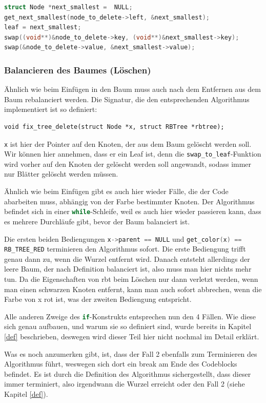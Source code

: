 \documentclass[11pt]{article}
\newcommand{\lstin}[1]{\lstinline[language=C]{#1}}
\begin{document}
\begin{lstlisting}[language=C]
struct Node *next_smallest =  NULL;
get_next_smallest(node_to_delete->left, &next_smallest);
leaf = next_smallest;
swap((void**)&node_to_delete->key, (void**)&next_smallest->key);
swap(&node_to_delete->value, &next_smallest->value);
\end{lstlisting}

\subsubsection{Balancieren des Baumes (Löschen)}
Ähnlich wie beim Einfügen in den Baum muss auch nach dem Entfernen aus dem Baum rebalanciert werden.
Die Signatur, die den entsprechenden Algorithmus implementiert ist so definiert:
\begin{lstlisting}
void fix_tree_delete(struct Node *x, struct RBTree *rbtree);
\end{lstlisting}

\lstin{x} ist hier der Pointer auf den Knoten, der aus dem Baum gelöscht werden soll. Wir können hier annehmen, dass er ein Leaf ist,
denn die \lstin{swap_to_leaf}-Funktion wird vorher auf den Knoten der gelöscht werden soll angewandt, sodass immer nur Blätter gelöscht werden müssen.

Ähnlich wie beim Einfügen gibt es auch hier wieder Fälle, die der Code abarbeiten muss, abhängig von der Farbe bestimmter Knoten.
Der Algorithmus befindet sich in einer \lstin{while}-Schleife, weil es auch hier wieder passieren kann, dass es mehrere Durchläufe gibt, bevor der Baum balanciert ist.

Die ersten beiden Bediengungen \lstin{x->parent == NULL} und \lstin{get_color(x) == RB_TREE_RED} terminieren den Algorithmus sofort.
Die erste Bediengung trifft genau dann zu, wenn die Wurzel entfernt wird. Danach entsteht allerdings der leere Baum, der nach Definition balanciert ist, also muss man hier nichts mehr tun.
Da die Eigenschaften von \gls{rbt} beim Löschen nur dann verletzt werden, wenn man einen schwarzen Knoten entfernt,
kann man auch sofort abbrechen, wenn die Farbe von x rot ist, was der zweiten Bediengung entspricht.

Alle anderen Zweige des \lstin{if}-Konstrukts entsprechen nun den 4 Fällen.
Wie diese sich genau aufbauen, und warum sie so definiert sind, wurde bereits in Kapitel \ref{def} beschrieben, deswegen wird dieser Teil hier nicht nochmal im Detail erklärt.

Was es noch anzumerken gibt, ist, dass der Fall 2 ebenfalls zum Terminieren des Algorithmus führt, weswegen sich dort ein break am Ende des Codeblocks befindet.
Es ist durch die Definition des Algorithmus sichergestellt, dass dieser immer terminiert, also irgendwann die Wurzel erreicht oder den Fall 2 (siehe Kapitel \ref{def}).
\end{document}
